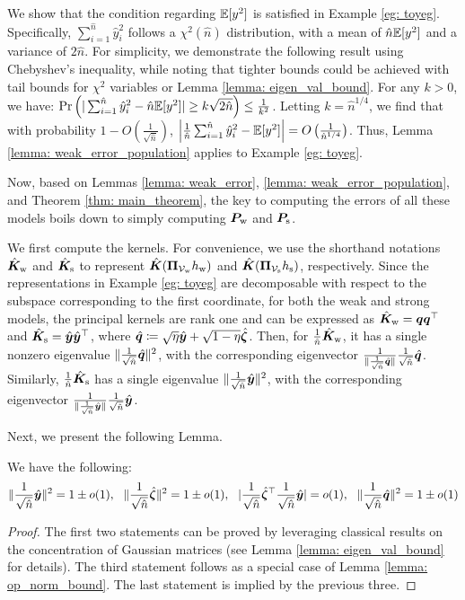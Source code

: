 We show that the condition regarding $\mathbb{E}[y^2]$ is satisfied in Example \ref{eg: toyeg}. Specifically, $\sum_{i=1}^{\hat{n}} \hat{y}_i^2$ follows a $\chi^2(\hat{n})$ distribution, with a mean of $\hat{n} \mathbb{E}[y^2]$ and a variance of $2\hat{n}$. For simplicity, we demonstrate the following result using Chebyshev's inequality, while noting that tighter bounds could be achieved with tail bounds for $\chi^2$ variables or Lemma \ref{lemma: eigen_val_bound}. For any $k > 0$, we have:
$
\Pr\left(| \sum_{i=1}^{\hat{n}} \hat{y}_i^2 - \hat{n} \mathbb{E}[y^2] | \geq k \sqrt{2\hat{n}} \right) \leq \frac{1}{k^2}$. Letting $k = \hat{n}^{1/4}$, we find that with probability $1 - O\left(\frac{1}{\sqrt{\hat{n}}}\right)$,
$
\left| \frac{1}{\hat{n}} \sum_{i=1}^{\hat{n}} \hat{y}_i^2 - \mathbb{E}[y^2] \right| = O\left(\frac{1}{\hat{n}^{1/4}}\right)$. Thus, Lemma \ref{lemma: weak_error_population} applies to Example \ref{eg: toyeg}.

Now, based on Lemmas \ref{lemma: weak_error}, \ref{lemma: weak_error_population}, and Theorem \ref{thm: main_theorem}, the key to computing the errors of all these models boils down to simply computing ${\bm{P}}_{\text{w}}$ and ${\bm{P}}_{\text{s}}$.

We first compute the kernels. For convenience, we use the shorthand notations $\hat{{\bm{K}}}_{\text{w}}$ and $\hat{{\bm{K}}}_{\text{s}}$ to represent $\hat{{\bm{K}}}({\bm{\Pi}}_{{\mathcal{V}}_{\text{w}}}h_{\text{w}})$ and $\hat{{\bm{K}}}({\bm{\Pi}}_{{\mathcal{V}}_{\text{s}}}h_{\text{s}})$, respectively. Since the representations in Example \ref{eg: toyeg} are decomposable with respect to the subspace corresponding to the first coordinate, for both the weak and strong models, the principal kernels are rank one and can be expressed as $\hat{{\bm{K}}}_{\text{w}} = {\bm{q}}{\bm{q}}^\top $ and $\hat{{\bm{K}}}_{\text{s}} =\hat{{\bm{y}}}\hat{{\bm{y}}}^\top$, where $\hat{{\bm{q}}}\coloneqq \sqrt{\eta}\hat{{\bm{y}}}+\sqrt{1-\eta}\hat{{\bm{\zeta}}}   $.  Then, for $\frac{1}{\hat{n}}\hat{{\bm{K}}}_{\text{w}}$, it has a single nonzero eigenvalue $\| \frac{1}{\sqrt{\hat{n}}} \hat{{\bm{q}}} \|^2$, with the corresponding eigenvector $\frac{1}{\|\frac{1}{\sqrt{\hat{n}}} \hat{{\bm{q}}} \|} \frac{1}{\sqrt{\hat{n}}} \hat{{\bm{q}}}$. Similarly, $\frac{1}{\hat{n}}\hat{{\bm{K}}}_{\text{s}}$ has a single eigenvalue $\| \frac{1}{\sqrt{\hat{n}}} \hat{{\bm{y}}} \|^2$, with the corresponding eigenvector $\frac{1}{\|\frac{1}{\sqrt{\hat{n}}} \hat{{\bm{y}}} \|} \frac{1}{\sqrt{\hat{n}}} \hat{{\bm{y}}}$.

Next, we present the following Lemma.
\begin{lemma}\label{lemma: yzetaq} We have the following:
\begin{align}
    \nonumber
    \|\frac{1}{\sqrt{\hat{n}}} \hat{{\bm{y}}} \|^2 = 1\pm o(1),~~ \|\frac{1}{\sqrt{\hat{n}}} \hat{{\bm{\zeta}}} \|^2 = 1\pm o(1), ~~| \frac{1}{\sqrt{\hat{n}}} \hat{{\bm{\zeta}}}^\top \frac{1}{\sqrt{\hat{n}}} \hat{{\bm{y}}} |= o(1), ~~ \|\frac{1}{\sqrt{\hat{n}}} \hat{{\bm{q}}} \|^2 = 1\pm o(1)
\end{align}
\end{lemma}
\begin{proof}
The first two statements can be proved by leveraging classical results on the concentration of Gaussian matrices (see Lemma \ref{lemma: eigen_val_bound} for details). The third statement follows as a special case of Lemma \ref{lemma: op_norm_bound}.  The last statement is implied by the previous three.
\end{proof}


